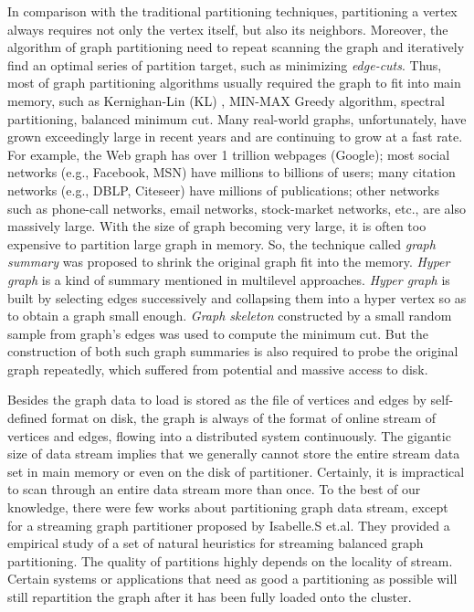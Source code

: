 \documentclass{sig-alternate-2013}
\begin{document}
In comparison with the traditional partitioning techniques, partitioning a vertex always requires not only the vertex itself, but also its neighbors. Moreover, the algorithm of graph partitioning need to repeat scanning the graph and iteratively find an optimal series of partition target, such as minimizing \textit{edge-cuts}.
Thus, most of graph partitioning algorithms usually required the graph to fit into main memory, such as Kernighan-Lin (KL) \cite{Fiduccia:klvar, Kernighan:kl}, MIN-MAX Greedy algorithm\cite{Battiti:minmaxgreedy, Laguna:greedy}, spectral partitioning\cite{Luxburg:spectralcluster}, balanced minimum cut\cite{Karger:mincut}.
Many real-world graphs, unfortunately, have grown exceedingly large in recent years and are continuing to grow at a fast rate. For example, the Web graph has over 1 trillion webpages (Google); most social networks (e.g., Facebook, MSN) have millions to billions of users; many citation networks (e.g., DBLP, Citeseer) have millions of publications; other networks such as phone-call networks, email networks, stock-market networks, etc., are also massively large. With the size of graph becoming very large, it is often too expensive to partition large graph in memory.
So, the technique called \emph{graph summary} was proposed to shrink the original graph fit into the memory. \emph{Hyper graph} is a kind of summary mentioned in  multilevel approaches\cite{Lang:multilevel, Teng:multilevel, Dhillon:multilevel}. \emph{Hyper graph} is built by selecting edges successively and collapsing them into a hyper vertex so as to obtain a graph small enough. \emph{Graph skeleton} constructed by a small random sample from graph's edges\cite{Karger:mincut} was used to compute the minimum cut. But the construction of both such graph summaries is also required to probe the original graph repeatedly, which suffered from potential and massive access to disk.

Besides the graph data to load is stored as the file of vertices and edges by self-defined format on disk, the graph is always of the format of online stream of vertices and edges, flowing into a distributed system continuously. The gigantic size of data stream implies that we generally cannot store the entire stream data set in main memory or even on the disk of partitioner. Certainly, it is impractical to scan through an entire data stream more than once. To the best of our knowledge, there were few works about partitioning graph data stream, except for a streaming graph partitioner proposed by Isabelle.S et.al\cite{Stanton:streampartition}. They provided a empirical study of a set of natural heuristics for streaming balanced graph partitioning. The quality of partitions highly depends on the locality of stream. Certain systems or applications that need as good a partitioning as possible will still repartition the graph after it has been fully loaded onto the cluster.
\end{document}
